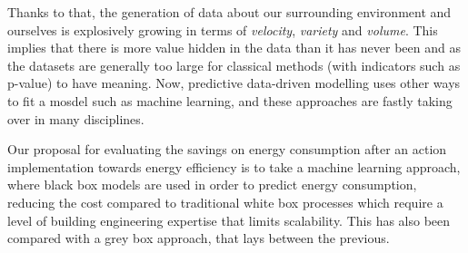 \documentclass[10pt, conference, compsocconf]{IEEEtran}
\begin{document}
Thanks to that, the generation of data about our surrounding environment and ourselves is explosively growing in terms of \emph{velocity}, \emph{variety} and \emph{volume}. This implies that there is more value hidden in the data than it has never been and as the datasets are generally too large for classical methods (with indicators such as p-value) to have meaning. Now, predictive data-driven modelling uses other ways to fit a mosdel such as machine learning, and these approaches are fastly taking over in many disciplines.




Our proposal for evaluating the savings on energy consumption after an action implementation towards energy efficiency is to take a machine learning approach, where black box models are used in order to predict energy consumption, reducing the cost compared to traditional white box processes which require a level of building engineering expertise that limits scalability. This has also been compared with a grey box approach, that lays between the previous.






\end{document}
